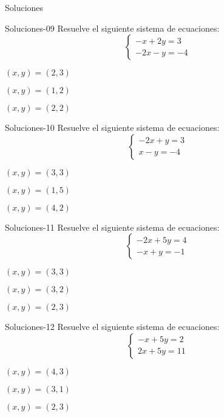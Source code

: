 \documentclass[a4,11pt]{aleph-notas}
\begin{document}
\begin{quiz}{Soluciones}
\begin{multi}[]%
    {Soluciones-09}
    Resuelve el siguiente sistema de ecuaciones:
    \[
    \begin{cases}
    -x + 2y = 3 \\
    -2x - y = -4
    \end{cases}
    \]
    \item $(x, y) = (2, 3)$
    \item* $(x, y) = (1, 2)$
    \item $(x, y) = (2, 2)$
\end{multi}

\begin{multi}[]%
    {Soluciones-10}
    Resuelve el siguiente sistema de ecuaciones:
    \[
    \begin{cases}
    -2x + y = 3 \\
    x - y = -4
    \end{cases}
    \]
    \item $(x, y) = (3, 3)$
    \item* $(x, y) = (1, 5)$
    \item $(x, y) = (4, 2)$
\end{multi}

\begin{multi}[]%
    {Soluciones-11}
    Resuelve el siguiente sistema de ecuaciones:
    \[
    \begin{cases}
    -2x + 5y = 4 \\
    -x + y = -1
    \end{cases}
    \]
    \item $(x, y) = (3, 3)$
    \item* $(x, y) = (3, 2)$
    \item $(x, y) = (2, 3)$
\end{multi}

\begin{multi}[]%
    {Soluciones-12}
    Resuelve el siguiente sistema de ecuaciones:
    \[
    \begin{cases}
    -x + 5y = 2 \\
    2x + 5y = 11
    \end{cases}
    \]
    \item $(x, y) = (4, 3)$
    \item* $(x, y) = (3, 1)$
    \item $(x, y) = (2, 3)$
\end{multi}


\end{quiz}
\end{document}
